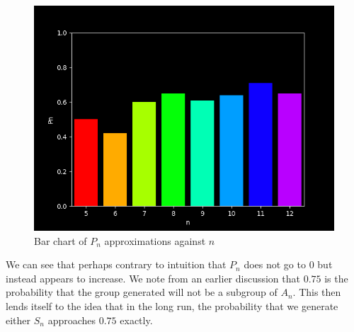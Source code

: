 \documentclass{article}
\begin{document}
\begin{figure}[ht!]
	\includegraphics[width=\textwidth]{PnRainbow.png}
	\caption{Bar chart of $P_n$ approximations against $n$}
\end{figure}

We can see that perhaps contrary to intuition that $P_n$ does not go to $0$ but instead appears to increase. We note from an earlier discussion that $0.75$ is the probability that the group generated will not be a subgroup of $A_n$.
This then lends itself to the idea that in the long run, the probability that we generate either $S_n$ approaches $0.75$ exactly.
\end{document}
